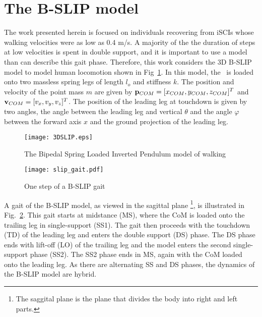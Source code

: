 \section{The B-SLIP model}
The work presented herein is focused on individuals recovering from iSCIs whose walking velocities were as low as 0.4 m/s. A majority of the the duration of steps at low velocities is spent in double support, and it is important to use a model than can describe this gait phase. Therefore, this work considers the 3D B-SLIP model to model human locomotion shown in Fig~\ref{fig:slip}. In this model, the \COM~is loaded onto two massless spring legs of length $ l_o $ and stiffness $ k $. The position and velocity of the point mass $ m $ are given by $ \mathbf{p}_{COM} = [x_{COM} ,y_{COM} ,z_{COM}]^T $ and $ \mathbf{v}_{COM} = [v_x ,v_y ,v_z]^T $. The position of the leading leg at touchdown is given by two angles, the angle between the leading leg and vertical $ \theta $ and the angle $ \varphi $ between the forward axis $ x $  and the ground projection of the leading leg.
%
\begin{figure}
	\centering
	\texttt{[image: 3DSLIP.eps]}
	\caption{The Bipedal Spring Loaded Inverted Pendulum \cite{liu2015dynamic} model of walking}\label{fig:slip}
\end{figure}
%
\begin{figure}
	\centering
	\texttt{[image: slip\_gait.pdf]}
	\caption{One step of a B-SLIP gait}\label{fig:slip_gait}
\end{figure} 
%

A gait of the B-SLIP model, as viewed in the sagittal plane \footnote{The saggital plane is the plane that divides the body into right and left parts.}, is illustrated in Fig.~\ref{fig:slip_gait}. This gait starts at midstance (MS), where the CoM is loaded onto the trailing leg in single-support (SS1). The gait then proceeds with the touchdown (TD) of the leading leg and enters the double support (DS) phase. The DS phase ends with lift-off (LO) of the trailing leg and the model enters the second single-support phase (SS2). The SS2 phase ends in MS, again with the CoM loaded onto the leading leg. As there are alternating SS and DS phases, the dynamics of the B-SLIP model are hybrid.

